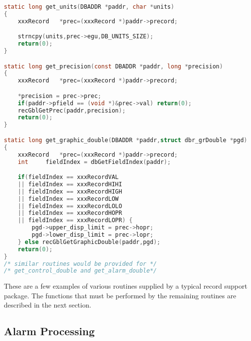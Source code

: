\begin{lstlisting}[language=C]
static long get_units(DBADDR *paddr, char *units)
{
    xxxRecord	*prec=(xxxRecord *)paddr->precord;

    strncpy(units,prec->egu,DB_UNITS_SIZE);
    return(0);
}

static long get_precision(const DBADDR *paddr, long *precision)
{
    xxxRecord	*prec=(xxxRecord *)paddr->precord;

    *precision = prec->prec;
    if(paddr->pfield == (void *)&prec->val) return(0);
    recGblGetPrec(paddr,precision);
    return(0);
}

static long get_graphic_double(DBADDR *paddr,struct dbr_grDouble *pgd)
{
    xxxRecord	*prec=(xxxRecord *)paddr->precord;
    int		fieldIndex = dbGetFieldIndex(paddr);

    if(fieldIndex == xxxRecordVAL
    || fieldIndex == xxxRecordHIHI
    || fieldIndex == xxxRecordHIGH
    || fieldIndex == xxxRecordLOW
    || fieldIndex == xxxRecordLOLO
    || fieldIndex == xxxRecordHOPR
    || fieldIndex == xxxRecordLOPR) {
        pgd->upper_disp_limit = prec->hopr;
        pgd->lower_disp_limit = prec->lopr;
    } else recGblGetGraphicDouble(paddr,pgd);
    return(0);
}
/* similar routines would be provided for */
/* get_control_double and get_alarm_double*/
\end{lstlisting}

These are a few examples of various routines supplied by a typical record support package.
The functions that must be performed by the remaining routines are described in the next section.

\subsection{Alarm Processing}

